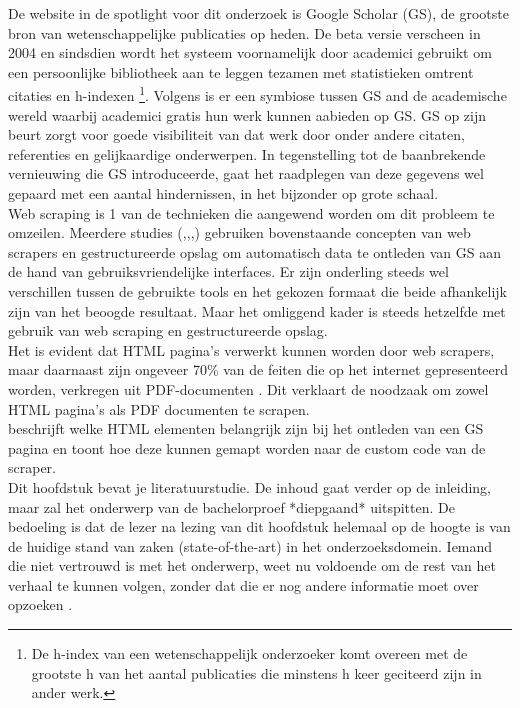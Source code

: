 De website in de spotlight voor dit onderzoek is Google Scholar (GS), de grootste bron van wetenschappelijke publicaties op heden. De beta versie verscheen in 2004 en sindsdien wordt het systeem voornamelijk door academici gebruikt om een persoonlijke bibliotheek aan te leggen tezamen met statistieken omtrent citaties en h-indexen \footnote{De h-index van een wetenschappelijk onderzoeker komt overeen met de grootste h van het aantal publicaties die minstens h keer geciteerd zijn in ander werk.}. Volgens \textcite{Oh2019} is er een symbiose tussen GS and de academische wereld waarbij academici gratis hun werk kunnen aabieden op GS. GS op zijn beurt zorgt voor goede visibiliteit van dat werk door onder andere citaten, referenties en gelijkaardige onderwerpen. In tegenstelling tot de baanbrekende vernieuwing die GS introduceerde, gaat het raadplegen van deze gegevens wel gepaard met een aantal hindernissen, in het bijzonder op grote schaal.\\
Web scraping is 1 van de technieken die aangewend worden om dit probleem te omzeilen. Meerdere studies (\autocite{Pratiba2018},\autocite{Rafsanjani2022},\autocite{Amin2024},\autocite{Sulistya2024}) gebruiken bovenstaande concepten van web scrapers en gestructureerde opslag om automatisch data te ontleden van GS aan de hand van gebruiksvriendelijke interfaces. Er zijn onderling steeds wel verschillen tussen de gebruikte tools en het gekozen formaat die beide afhankelijk zijn van het beoogde resultaat. Maar het omliggend kader is steeds hetzelfde met gebruik van web scraping en gestructureerde opslag.\\
Het is evident dat HTML pagina's verwerkt kunnen worden door web scrapers, maar daarnaast zijn ongeveer 70\% van de feiten die op het internet gepresenteerd worden, verkregen uit PDF-documenten \autocite{Singrodia2019}. Dit verklaart de noodzaak om zowel HTML pagina's als PDF documenten te scrapen.\\
\textcite{Yang2017} beschrijft welke HTML elementen belangrijk zijn bij het ontleden van een GS pagina en \textcite{Rahmatulloh2020} toont hoe deze kunnen gemapt worden naar de custom code van de scraper.\\

Dit hoofdstuk bevat je literatuurstudie. De inhoud gaat verder op de inleiding, maar zal het onderwerp van de bachelorproef *diepgaand* uitspitten. De bedoeling is dat de lezer na lezing van dit hoofdstuk helemaal op de hoogte is van de huidige stand van zaken (state-of-the-art) in het onderzoeksdomein. Iemand die niet vertrouwd is met het onderwerp, weet nu voldoende om de rest van het verhaal te kunnen volgen, zonder dat die er nog andere informatie moet over opzoeken \autocite{Pollefliet2011}.

